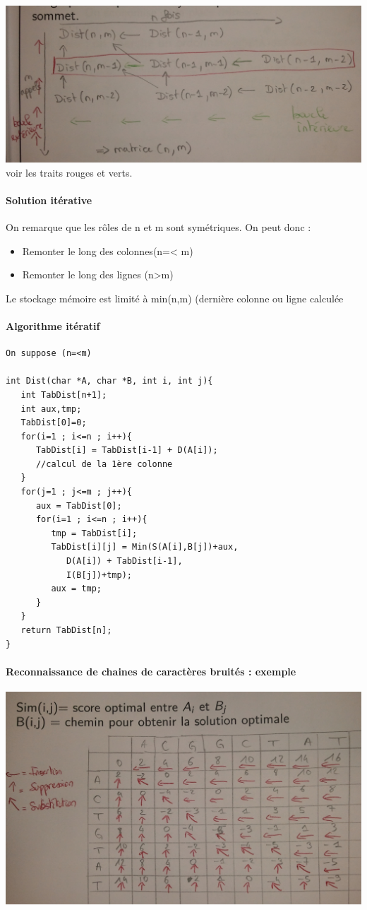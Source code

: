 \includegraphics[width=15cm]{Photo0090}
voir les traits rouges et verts.


\paragraph{Solution itérative}
On remarque que les rôles de n et m sont symétriques. On peut donc :
\begin{itemize}
\item Remonter le long des colonnes(n=< m)
\item Remonter le long des lignes (n>m)
\end{itemize}
Le stockage mémoire est limité à min(n,m) (dernière colonne ou ligne calculée


\paragraph{Algorithme itératif}

\begin{verbatim}
On suppose (n=<m)

int Dist(char *A, char *B, int i, int j){
   int TabDist[n+1];
   int aux,tmp;
   TabDist[0]=0;
   for(i=1 ; i<=n ; i++){
      TabDist[i] = TabDist[i-1] + D(A[i]);
      //calcul de la 1ère colonne
   }
   for(j=1 ; j<=m ; j++){
      aux = TabDist[0];
      for(i=1 ; i<=n ; i++){
         tmp = TabDist[i];
         TabDist[i][j] = Min(S(A[i],B[j])+aux,
            D(A[i]) + TabDist[i-1],
            I(B[j])+tmp);
         aux = tmp;
      }
   }
   return TabDist[n];
}
\end{verbatim}

\paragraph{Reconnaissance de chaines de caractères bruités : exemple}

\includegraphics[width=15cm]{Photo0089}

